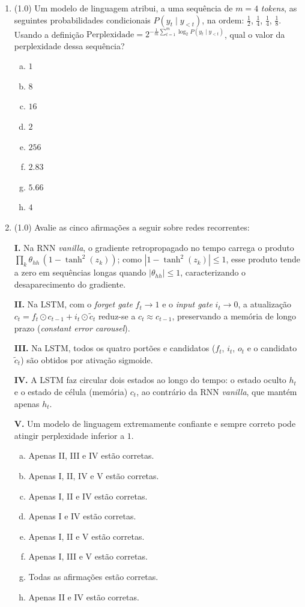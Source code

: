 \documentclass[11pt,a4paper]{article}
\begin{document}
\begin{enumerate}[1)]
\item (1.0) Um modelo de linguagem atribui, a uma sequência de $m = 4$ \textit{tokens}, as seguintes probabilidades condicionais $P(y_t \mid y_{<t})$, na ordem: $\tfrac{1}{2}$, $\tfrac{1}{4}$, $\tfrac{1}{4}$, $\tfrac{1}{8}$. Usando a definição $\text{Perplexidade} = 2^{-\frac{1}{m}\sum_{t=1}^{m}\log_2 P(y_t \mid y_{<t})}$, qual o valor da perplexidade dessa sequência?

\begin{enumerate}[a)]
    \item $1$
    \item $8$
    \item $16$
    \item $2$
    \item $256$
    \item $2.83$
    \item $5.66$
    \item $4$
\end{enumerate}

\item (1.0) Avalie as cinco afirmações a seguir sobre redes recorrentes:

\textbf{I.} Na RNN \textit{vanilla}, o gradiente retropropagado no tempo carrega o produto $\prod_k \theta_{hh}\,(1 - \tanh^2(z_k))$; como $|1 - \tanh^2(z_k)| \le 1$, esse produto tende a zero em sequências longas quando $|\theta_{hh}| \le 1$, caracterizando o desaparecimento do gradiente.

\textbf{II.} Na LSTM, com o \textit{forget gate} $f_t \to 1$ e o \textit{input gate} $i_t \to 0$, a atualização $c_t = f_t \odot c_{t-1} + i_t \odot \tilde{c}_t$ reduz-se a $c_t \approx c_{t-1}$, preservando a memória de longo prazo (\textit{constant error carousel}).

\textbf{III.} Na LSTM, todos os quatro portões e candidatos ($f_t$, $i_t$, $o_t$ e o candidato $\tilde{c}_t$) são obtidos por ativação sigmoide.

\textbf{IV.} A LSTM faz circular dois estados ao longo do tempo: o estado oculto $h_t$ e o estado de célula (memória) $c_t$, ao contrário da RNN \textit{vanilla}, que mantém apenas $h_t$.

\textbf{V.} Um modelo de linguagem extremamente confiante e sempre correto pode atingir perplexidade inferior a $1$.

\begin{enumerate}[a)]
    \item Apenas II, III e IV estão corretas.
    \item Apenas I, II, IV e V estão corretas.
    \item Apenas I, II e IV estão corretas.
    \item Apenas I e IV estão corretas.
    \item Apenas I, II e V estão corretas.
    \item Apenas I, III e V estão corretas.
    \item Todas as afirmações estão corretas.
    \item Apenas II e IV estão corretas.
\end{enumerate}

\end{enumerate}
\end{document}
